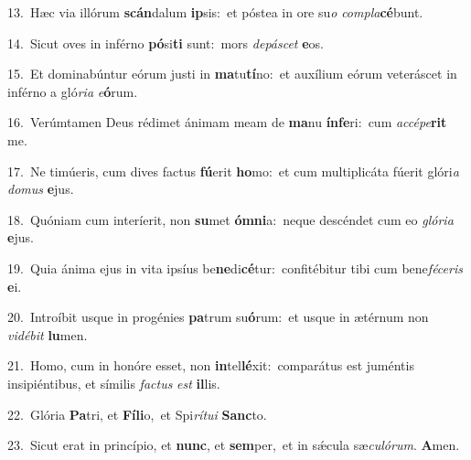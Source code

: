 {\numbfont\textcolor{\numbcolor}{13.}}~Hæc via illórum \textbf{scán}\-dalum \textbf{ip}\-sis:~\star et póstea in ore su\textit{o} \textit{com}\-\textit{pla}\textbf{cé}bunt.\par
{\numbfont\textcolor{\numbcolor}{14.}}~Sicut oves in inférno \textbf{pó}\-si\textbf{ti} sunt:~\star mors \textit{de}\-\textit{pá}\textit{scet} \textbf{e}\-os.\par
{\numbfont\textcolor{\numbcolor}{15.}}~Et dominabúntur eórum justi in \textbf{ma}\-tu\-\textbf{tí}\-no:~\star et auxílium eórum veteráscet in inférno a gló\-\textit{ri}\-\textit{a} \textit{e}\-\textbf{ó}rum.\par
{\numbfont\textcolor{\numbcolor}{16.}}~Verúmtamen Deus rédimet ánimam meam de \textbf{ma}\-nu \textbf{ín}\-\textbf{fe}ri:~\star cum \textit{ac}\-\textit{cé}\textit{pe}\textbf{rit} me.\par
{\numbfont\textcolor{\numbcolor}{17.}}~Ne timúeris, cum dives factus \textbf{fú}\-erit \textbf{ho}\-mo:~\star et cum multiplicáta fúerit glóri\textit{a} \textit{do}\-\textit{mus} \textbf{e}\-jus.\par
{\numbfont\textcolor{\numbcolor}{18.}}~Quóniam cum interíerit, non \textbf{su}\-met \textbf{óm}\-\textbf{ni}a:~\star neque descéndet cum eo \textit{gló}\-\textit{ri}\textit{a} \textbf{e}\-jus.\par
{\numbfont\textcolor{\numbcolor}{19.}}~Quia ánima ejus in vita ipsíus be\-\textbf{ne}\-di\-\textbf{cé}\-tur:~\star confitébitur tibi cum bene\-\textit{fé}\-\textit{ce}\textit{ris} \textbf{e}\-i.\par
{\numbfont\textcolor{\numbcolor}{20.}}~Introíbit usque in progénies \textbf{pa}\-trum su\-\textbf{ó}\-rum:~\star et usque in ætérnum non \textit{vi}\-\textit{dé}\textit{bit} \textbf{lu}\-men.\par
{\numbfont\textcolor{\numbcolor}{21.}}~Homo, cum in honóre esset, non \textbf{in}\-tel\-\textbf{lé}\-xit:~\star comparátus est juméntis insipiéntibus, et símilis \textit{fac}\-\textit{tus} \textit{est} \textbf{il}\-lis.\par
{\numbfont\textcolor{\numbcolor}{22.}}~Glória \textbf{Pa}\-tri, et \textbf{Fí}\-\textbf{li}o,~\star et Spi\-\textit{rí}\-\textit{tu}\textit{i} \textbf{Sanc}\-to.\par
{\numbfont\textcolor{\numbcolor}{23.}}~Sicut erat in princípio, et \textbf{nunc}\-, et \textbf{sem}\-per,~\star et in sǽcula sæ\-\textit{cu}\-\textit{ló}\textit{rum}. \textbf{A}\-men.\par
